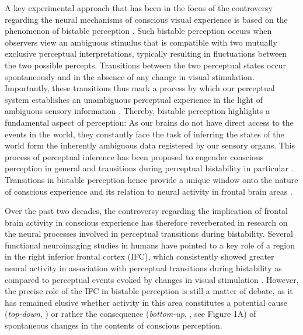 \documentclass[12pt]{article}
\begin{document}
A key experimental approach that has been in the focus of the controversy regarding the neural mechanisms of conscious visual experience is based on the phenomenon of bistable perception \parencite{Brascamp2018}. Such bistable perception occurs when observers view an ambiguous stimulus that is compatible with two mutually exclusive perceptual interpretations, typically resulting in fluctuations between the two possible percepts. Transitions between the two perceptual states occur spontaneously and in the absence of any change in visual stimulation. Importantly, these transitions thus mark a process by which our perceptual system establishes an unambiguous perceptual experience in the light of ambiguous sensory information \parencite{Sterzer2009, Hohwy2008a}. Thereby, bistable perception highlights a fundamental aspect of perception: As our brains do not have direct access to the events in the world, they constantly face the task of inferring the states of the world form the inherently ambiguous data registered by our sensory organs. This process of perceptual inference has been proposed to engender conscious perception in general \parencite{Hohwy2012} and transitions during perceptual bistability in particular \parencite{Sterzer2007, Hohwy2008a}. Transitions in bistable perception hence provide a unique window onto the nature of conscious experience and its relation to neural activity in frontal brain areas \parencite{Odegaard2017, Boly2017}.

Over the past two decades, the controversy regarding the implication of frontal brain activity in conscious experience has therefore reverberated in research on the neural processes involved in perceptual transitions during bistability. Several functional neuroimaging studies in humans have pointed to a key role of a region in the right inferior frontal cortex (IFC), which consistently showed greater neural activity in association with perceptual transitions during bistability as compared to perceptual events evoked by changes in visual stimulation \parencite{Brascamp2018}. However, the precise role of the IFC in bistable perception is still a matter of debate, as it has remained elusive whether activity in this area constitutes a potential cause (\textit{top-down}, \cite{Sterzer2007, Lumer1998, Weilnhammer2013}) or rather the consequence (\textit{bottom-up}, \cite{Knapen2011, Frassle2014, Brascamp2015}, see Figure 1A) of spontaneous changes in the contents of conscious perception.
\end{document}
